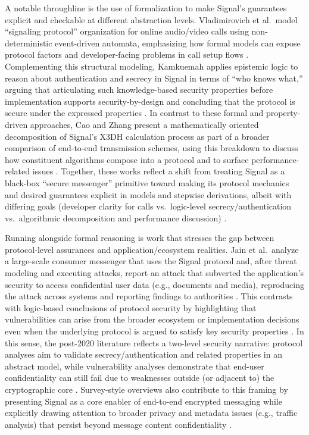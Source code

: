 A notable throughline is the use of formalization to make Signal’s guarantees explicit and checkable at different abstraction levels. Vladimirovich et al.\ model “signaling protocol” organization for online audio/video calls using non-deterministic event-driven automata, emphasizing how formal models can expose protocol factors and developer-facing problems in call setup flows \cite{vladimirovich2020}. Complementing this structural modeling, Kamkuemah applies epistemic logic to reason about authentication and secrecy in Signal in terms of “who knows what,” arguing that articulating such knowledge-based security properties before implementation supports security-by-design and concluding that the protocol is secure under the expressed properties \cite{kamkuemah2021}. In contrast to these formal and property-driven approaches, Cao and Zhang present a mathematically oriented decomposition of Signal’s X3DH calculation process as part of a broader comparison of end-to-end transmission schemes, using this breakdown to discuss how constituent algorithms compose into a protocol and to surface performance-related issues \cite{cao2022}. Together, these works reflect a shift from treating Signal as a black-box “secure messenger” primitive toward making its protocol mechanics and desired guarantees explicit in models and stepwise derivations, albeit with differing goals (developer clarity for calls vs.\ logic-level secrecy/authentication vs.\ algorithmic decomposition and performance discussion) \cite{vladimirovich2020,kamkuemah2021,cao2022}.

Running alongside formal reasoning is work that stresses the gap between protocol-level assurances and application/ecosystem realities. Jain et al.\ analyze a large-scale consumer messenger that uses the Signal protocol and, after threat modeling and executing attacks, report an attack that subverted the application’s security to access confidential user data (e.g., documents and media), reproducing the attack across systems and reporting findings to authorities \cite{jain2021}. This contrasts with logic-based conclusions of protocol security by highlighting that vulnerabilities can arise from the broader ecosystem or implementation decisions even when the underlying protocol is argued to satisfy key security properties \cite{kamkuemah2021,jain2021}. In this sense, the post-2020 literature reflects a two-level security narrative: protocol analyses aim to validate secrecy/authentication and related properties in an abstract model, while vulnerability analyses demonstrate that end-user confidentiality can still fail due to weaknesses outside (or adjacent to) the cryptographic core \cite{kamkuemah2021,jain2021}. Survey-style overviews also contribute to this framing by presenting Signal as a core enabler of end-to-end encrypted messaging while explicitly drawing attention to broader privacy and metadata issues (e.g., traffic analysis) that persist beyond message content confidentiality \cite{oppliger2020}.


